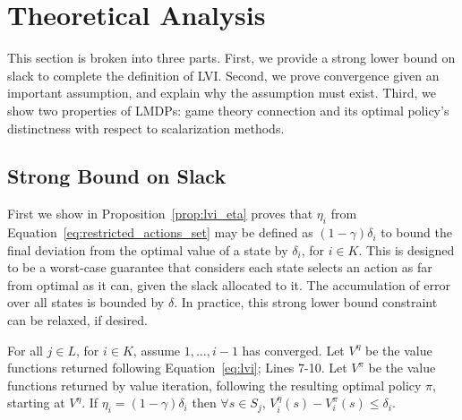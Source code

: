 \section{Theoretical Analysis}
\label{sec:theoretical_analysis}

This section is broken into three parts. First, we provide a strong lower bound on slack to complete the definition of LVI. Second, we prove convergence given an important assumption, and explain why the assumption must exist. Third, we show two properties of LMDPs: game theory connection and its optimal policy's distinctness with respect to scalarization methods.


\subsection{Strong Bound on Slack}

First we show in Proposition~\ref{prop:lvi_eta} proves that $\eta_i$ from Equation~\ref{eq:restricted_actions_set} may be defined as $(1 - \gamma) \delta_i$ to bound the final deviation from the optimal value of a state by $\delta_i$, for $i \in K$. This is designed to be a worst-case guarantee that considers each state selects an action as far from optimal as it can, given the slack allocated to it. The accumulation of error over all states is bounded by $\delta$. In practice, this strong lower bound constraint can be relaxed, if desired.


\begin{proposition}
    \label{prop:lvi_eta}
    For all $j \in L$, for $i \in K$, assume $1, \ldots, i - 1$ has converged. Let $V^\eta$ be the value functions returned following Equation~\ref{eq:lvi}; Lines 7-10. Let $V^\pi$ be the value functions returned by value iteration, following the resulting optimal policy $\pi$, starting at $V^\eta$. If $\eta_i = (1 - \gamma) \delta_i$ then $\forall s \in S_j$, $V_i^\eta(s) - V_i^\pi(s) \leq \delta_i$.
\end{proposition}

